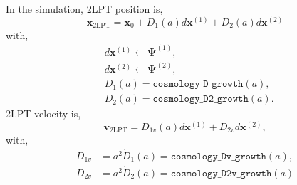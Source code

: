 \documentclass[a4paper]{article}
\begin{document}
\noindent In the simulation, 2LPT position is,
\begin{equation}
  \bm{x}_\mathrm{2LPT} = \bm{x}_0 + D_1(a) d\bm{x}^{(1)} + D_2(a) d\bm{x}^{(2)}
\end{equation}
with,
\begin{align}
  &d\bm{x}^{(1)} \leftarrow \bm{\Psi}^{(1)},\\
  &d\bm{x}^{(2)} \leftarrow \bm{\Psi}^{(2)},\\
  &D_1(a) = \texttt{cosmology\_D\_growth}(a),\\
  &D_2(a) =  \texttt{cosmology\_D2\_growth}(a).          
\end{align}
%
2LPT velocity is,
\begin{equation}
  \bm{v}_\mathrm{2LPT} = D_{1v}(a) d\bm{x}^{(1)} + D_{2v} d\bm{x}^{(2)},
\end{equation}
with,
\begin{align}
  D_{1v} &= a^2 \dot{D}_1(a) = \texttt{cosmology\_Dv\_growth}(a),\\
  D_{2v} &= a^2 \dot{D}_2(a) = \texttt{cosmology\_D2v\_growth}(a)
\end{align}
\end{document}
